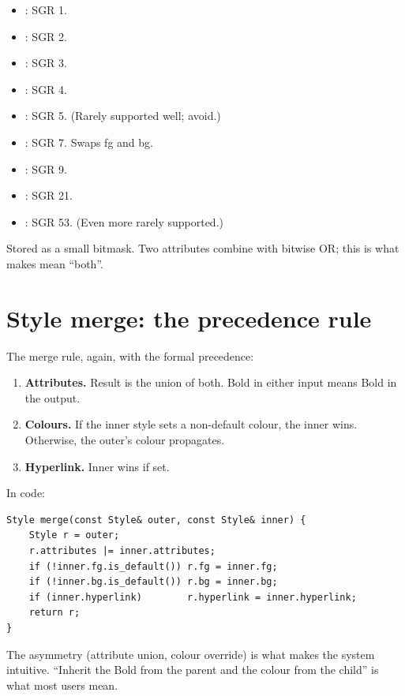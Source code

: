 \begin{itemize}[leftmargin=*]
  \item {}: SGR 1.
  \item {}: SGR 2.
  \item {}: SGR 3.
  \item {}: SGR 4.
  \item {}: SGR 5. (Rarely supported well; avoid.)
  \item {}: SGR 7. Swaps fg and bg.
  \item {}: SGR 9.
  \item {}: SGR 21.
  \item {}: SGR 53. (Even more rarely supported.)
\end{itemize}

Stored as a small bitmask. Two attributes combine with bitwise
OR; this is what makes  mean ``both''.

\section{Style merge: the precedence rule}

The merge rule, again, with the formal precedence:

\begin{enumerate}[leftmargin=*]
  \item \textbf{Attributes.} Result is the union of both. Bold
    in either input means Bold in the output.
  \item \textbf{Colours.} If the inner style sets a non-default
    colour, the inner wins. Otherwise, the outer's colour
    propagates.
  \item \textbf{Hyperlink.} Inner wins if set.
\end{enumerate}

In code:

\begin{lstlisting}
Style merge(const Style& outer, const Style& inner) {
    Style r = outer;
    r.attributes |= inner.attributes;
    if (!inner.fg.is_default()) r.fg = inner.fg;
    if (!inner.bg.is_default()) r.bg = inner.bg;
    if (inner.hyperlink)        r.hyperlink = inner.hyperlink;
    return r;
}
\end{lstlisting}

The asymmetry (attribute union, colour override) is what makes
the system intuitive. ``Inherit the Bold from the parent and the
colour from the child'' is what most users mean.

